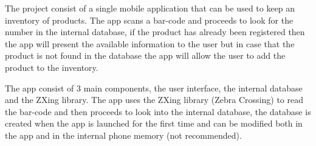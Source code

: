The project consist of a single mobile application that can be used to keep an inventory of products. The app scans a bar-code and proceeds to look for the number in the internal database, if the product has already been registered then the app will present the available information to the user but in case that the product is not found in the database the app will allow the user to add the product to the inventory.

The app consist of 3 main components, the user interface, the internal database and the ZXing library. The app uses the ZXing library (Zebra Crossing) to read the bar-code and then proceeds to look into the internal database, the database is created when the app is launched for the first time and can be modified both in the app and in the internal phone memory (not recommended).